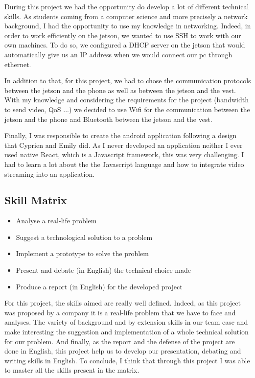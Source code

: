 During this project we had the opportunity do develop a lot of different technical skills. As students coming from a computer science and more precisely a network background, I had the opportunity to use my knowledge in networking. Indeed, in order to work efficiently on the jetson, we wanted to use SSH to work with our own machines. To do so, we configured a DHCP server on the jetson that would automatically give us an IP address when we would connect our pc through ethernet. 
\\\par
In addition to that, for this project, we had to chose the communication protocols between the jetson and the phone as well as between the jetson and the vest. With my knowledge and considering the requirements for the project (bandwidth to send video, QoS ...) we  decided to use Wifi for the communication between the jetson and the phone and Bluetooth between the jetson and the vest.
\\\par
Finally, I was responsible to create the android application following a design that Cyprien and Emily did. As I never developed an application neither I ever used native React, which is a Javascript framework, this was very challenging. I had to learn a lot about the the Javascript language and how to integrate video streaming into an application. 

\subsection{Skill Matrix}

\begin{itemize}
    \item Analyse a real-life problem
    \item Suggest a technological solution to a problem
    \item Implement a prototype to solve the problem
    \item Present and debate (in English) the technical choice made
    \item Produce a report (in English) for the developed project 
\end{itemize}

For this project, the skills aimed are really well defined. Indeed, as this project was proposed by a company it is a real-life problem that we have to face and analyses. The variety of background and by extension skills in our team ease and make interesting the suggestion and implementation of a whole technical solution for our problem. And finally, as the report and the defense of the project are done in English, this project help  us to develop our presentation, debating and writing skills in English. To conclude, I think that through this project I was able to master all the skills present in the matrix.


